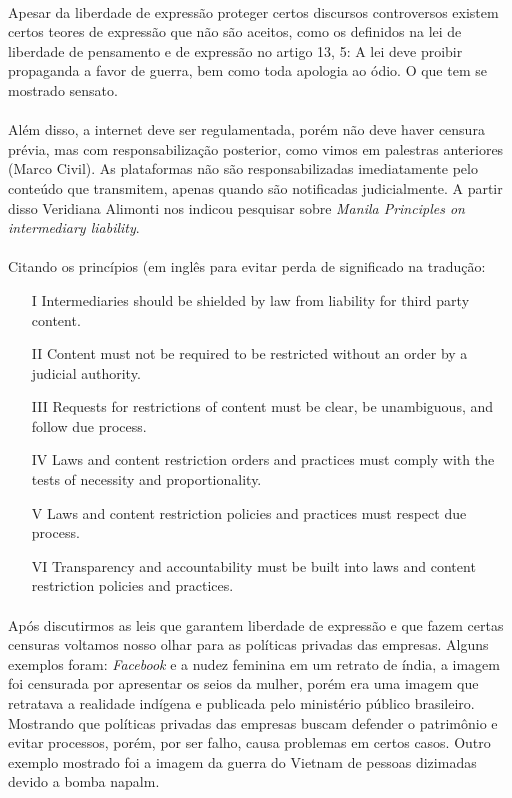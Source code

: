 \documentclass[12pt]{article}
\begin{document}
	\paragraph{}
		Apesar da liberdade de expressão proteger certos discursos controversos
		existem certos teores de expressão que não são aceitos, como os definidos
		na lei de liberdade de pensamento e de expressão no artigo 13, 5: A lei deve 
		proibir propaganda a favor de guerra, bem como toda apologia ao ódio. O que
		tem se mostrado sensato.
	\paragraph{}
		Além disso, a internet deve ser regulamentada, porém não deve haver censura 
		prévia, mas com responsabilização posterior, como vimos em palestras
		anteriores (Marco Civil). As plataformas não são responsabilizadas 
		imediatamente pelo conteúdo que transmitem, apenas quando são notificadas 
		judicialmente.
		A partir disso Veridiana Alimonti nos indicou pesquisar sobre \textit{Manila 
		Principles on intermediary liability}.
	\paragraph{}
		Citando os princípios (em inglês para evitar perda de significado na tradução:
		\begin{itemize}
			\item[I]
				Intermediaries should be shielded by law from liability for third party 
				content.
			\item[II]
				Content must not be required to be restricted without an order by a 
				judicial authority.
			\item[III]
				Requests for restrictions of content must be clear, be unambiguous, and 
				follow due process.
			\item[IV]
				Laws and content restriction orders and practices must comply with the 
				tests of necessity and proportionality.
			\item[V]
				Laws and content restriction policies and practices must respect due 
				process.
			\item[VI]
				Transparency and accountability must be built into laws and content 
				restriction policies and practices.					
		\end{itemize}			
	\paragraph{}
		Após discutirmos as leis que garantem liberdade de expressão e que fazem
		certas censuras voltamos nosso olhar para as políticas privadas das empresas.
		Alguns exemplos foram:
		\textit{Facebook} e a nudez feminina em um retrato de índia, a imagem
		foi censurada por apresentar os seios da mulher, porém era uma
		imagem que retratava a realidade indígena e publicada pelo ministério público
		brasileiro. Mostrando que políticas privadas das empresas buscam defender
		o patrimônio e evitar processos, porém, por ser falho, causa problemas em
		certos casos. Outro exemplo mostrado foi a imagem da guerra do Vietnam de  
		pessoas dizimadas devido a bomba napalm.
\end{document}
